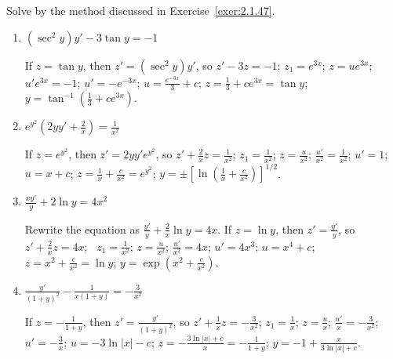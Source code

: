 \documentclass{ximera}
\begin{document}
\begin{problem}\label{exer:2.1.48}
Solve by the method discussed in Exercise~\ref{exer:2.1.47}.

\begin{enumerate} 
\item 
$(\sec^2y)y'- 3\tan y=-1$



\begin{solution}
    If $z=\tan y$, then $z'=(\sec^2y)y'$, so $z'-3z=-1$;\;
$z_1=e^{3x}$;\;
$z=ue^{3x}$;\;
$u'e^{3x}=-1$;\;
$u'=-e^{-3x}$;\;
$u=\frac{e^{-3x}}{3}+c$;\;
$z=\frac{1}{3}+ce^{3x}=\tan y$;\;
$y=\tan^{-1}\left(\frac{1}{3}+ce^{3x}\right)$.
\end{solution}

\item 
$e^{y^2}\left(2yy'+\frac{2}{x}\right) =\frac{1}{x^2}$



\begin{solution}
    If $z=e^{y^2}$, then $z'=2yy'e^{y^2}$, so $z'+\frac{2}{
x}z=\frac{1}{ x^2}$;\;
$z_1=\frac{1}{ x^2}$;\;
$z=\frac{u}{ x^2}$;\;
$\frac{u'}{ x^2}=\frac{1}{ x^2}$;\;
$u'=1$;\;
$u=x+c$;\;
$z=\frac{1}{ x}+\frac{c}{ x^2}=e^{y^2}$;\;
$y=\pm\left[\ln\left(\frac{1}{ x}+\frac{c}{
x^2}\right)\right]^{1/2}$.
\end{solution}

\item 
$\frac{xy'}{y} + 2\ln y=4x^2$



\begin{solution}
    Rewrite the equation as $\frac{y'}{ y}+\frac{2}{ x}\ln y=4x$.
If $z=\ln y$, then $z'=\frac{y'}{ y}$, so $z'+\frac{2}{ x}z=4x$;
\
$z_1=\frac{1}{ x^2}$;\;
$z=\frac{u}{ x^2}$;\;
$\frac{u'}{ x^2}=4x$;\;
$u'=4x^3$;\;
$u=x^4+c$;\;
$z=x^2+\frac{c}{ x^2}=\ln y$;\;
$y=\exp\left(x^2+\frac{c}{ x^2}\right)$.
\end{solution}

\item 
$\frac{y'}{(1+y)^2} -\frac{1}{x(1+y)}=-\frac{3}{x^2}$



\begin{solution}
    If $z=-\frac{1}{ 1+y}$, then $z'=\frac{y'}{(1+y)^2}$, so
$z'+\frac{1}{ x}z=-\frac{3}{ x^2}$;\;
$z_1=\frac{1}{ x}$;\;
$z=\frac{u}{ x}$;\;
$\frac{u'}{ x}=-\frac{3}{ x^2}$;\;
$u'=-\frac{3}{ x}$;\;
$u=-3\ln|x|-c$;\;
$z=-\frac{3\ln|x|+c}{ x}=-\frac{1}{1+y}$;\;
$y=-1+\frac{x}{3\ln|x|+c}$.
\end{solution}
\end{enumerate}
\end{problem}
\end{document}
